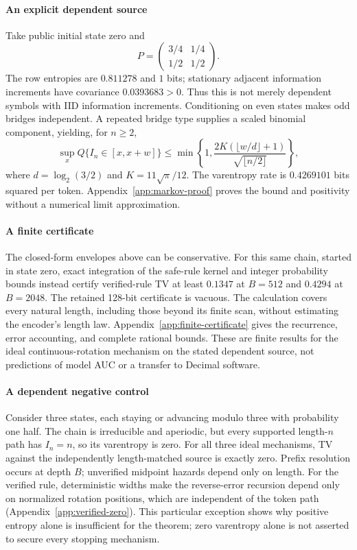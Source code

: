\paragraph{An explicit dependent source}
Take public initial state zero and
\begin{equation}
 P=\begin{pmatrix}3/4&1/4\\1/2&1/2\end{pmatrix}.
 \label{eq:dependent-source}
\end{equation}
The row entropies are $0.811278$ and $1$ bits; stationary adjacent information
increments have covariance $0.0393683>0$. Thus this is not merely dependent
symbols with IID information increments. Conditioning on even states makes
odd bridges independent. A repeated bridge type supplies a scaled binomial
component, yielding, for $n\ge2$,
\begin{equation}
 \sup_x Q\{I_n\in[x,x+w]\}\le
 \min\!\left\{1,\frac{2K(\lfloor w/d\rfloor+1)}{\sqrt{\lfloor n/2\rfloor}}\right\},
 \label{eq:explicit-markov}
\end{equation}
where $d=\log_2(3/2)$ and $K=11\sqrt\pi/12$. The varentropy rate is
$0.4269101$ bits squared per token. Appendix~\ref{app:markov-proof} proves the
bound and positivity without a numerical limit approximation.

\paragraph{A finite certificate}
The closed-form envelopes above can be conservative. For this same chain,
started in state zero, exact integration of the safe-rule kernel and integer
probability bounds instead certify verified-rule TV at least $0.1347$ at
$B=512$ and $0.4294$ at $B=2048$. The retained 128-bit certificate is vacuous.
The calculation covers every natural length, including those beyond its finite
scan, without estimating the encoder's length law. Appendix~\ref{app:finite-certificate}
gives the recurrence, error accounting, and complete rational bounds. These
are finite results for the ideal continuous-rotation mechanism on the stated
dependent source, not predictions of model AUC or a transfer to Decimal software.

\paragraph{A dependent negative control}
Consider three states, each staying or advancing modulo three with probability
one half. The chain is irreducible and aperiodic, but every supported length-$n$
path has $I_n=n$, so its varentropy is zero. For all three ideal mechanisms,
TV against the independently length-matched source is exactly zero. Prefix
resolution occurs at depth $B$; unverified midpoint hazards depend only on
length. For the verified rule, deterministic widths make the reverse-error
recursion depend only on normalized rotation positions, which are independent
of the token path (Appendix~\ref{app:verified-zero}). This particular exception
shows why positive entropy alone is insufficient for the theorem; zero
varentropy alone is not asserted to secure every stopping mechanism.

